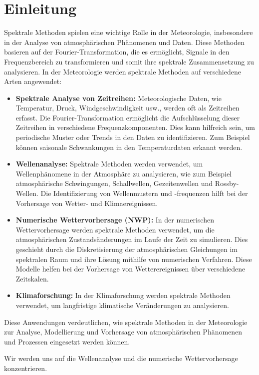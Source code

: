 %
%
%
%
\section{Einleitung\label{spektral:section:Einleitung}}

Spektrale Methoden spielen eine wichtige Rolle in der Meteorologie, insbesondere in der Analyse von atmosphärischen Phänomenen und Daten.
%
%
Diese Methoden basieren auf der Fourier-Trans\-for\-ma\-tion, die es ermöglicht, Signale in den Frequenzbereich zu transformieren und somit ihre spektrale Zusammensetzung zu analysieren.
In der Meteorologie werden spektrale Methoden auf verschiedene Arten angewendet:

\begin{itemize}
\item
\textbf{Spektrale Analyse von Zeitreihen:} Meteorologische Daten, wie Temperatur, Druck, Windgeschwindigkeit usw., werden oft als Zeitreihen erfasst.
Die Fourier-Transformation ermöglicht die Aufschlüsselung dieser Zeitreihen in verschiedene Frequenzkomponenten.
Dies kann hilfreich sein, um periodische Muster oder Trends in den Daten zu identifizieren. 
Zum Beispiel können saisonale Schwankungen in den Temperaturdaten erkannt werden.
\item
\textbf{Wellenanalyse:} Spektrale Methoden werden verwendet, um Wellenphänomene in der Atmosphäre zu analysieren, wie zum Beispiel atmosphärische Schwingungen, Schallwellen, Gezeitenwellen und Rossby-Wellen.
%
%
Die Identifizierung von Wellenmustern und -frequenzen hilft bei der Vorhersage von Wetter- und Klimaereignissen.
%
\item
\textbf{Numerische Wettervorhersage (NWP):} In der numerischen Wettervorhersage werden spektrale Methoden verwendet, um die atmosphärischen Zustandsänderungen im Laufe der Zeit zu simulieren.
%
%
Dies geschieht durch die Diskretisierung der atmosphärischen Gleichungen im spektralen Raum und ihre Lösung mithilfe von numerischen Verfahren.
Diese Modelle helfen bei der Vorhersage von Wetterereignissen über verschiedene Zeitskalen.
\item
\textbf{Klimaforschung:} In der Klimaforschung werden spektrale Methoden verwendet, um langfristige klimatische Veränderungen zu analysieren.
\end{itemize}

Diese Anwendungen verdeutlichen, wie spektrale Methoden in der Meteorologie zur Analyse, Modellierung und Vorhersage von atmosphärischen Phänomenen und Prozessen eingesetzt werden können.

Wir werden uns auf die Wellenanalyse und die numerische Wettervorhersage konzentrieren.
